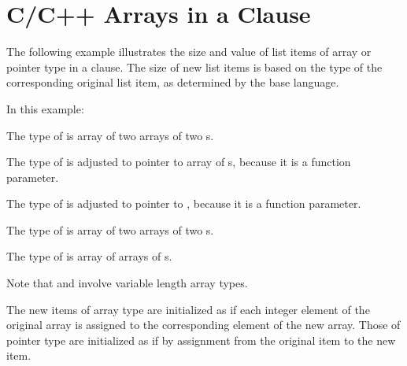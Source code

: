 \section{C/C++ Arrays in a  Clause}
\ccppspecificstart
\label{sec:carrays_fpriv}

The following example illustrates the size and value of list items of array or 
pointer type in a  clause. The size of new list items is 
based on the type of the corresponding original list item, as determined by the 
base language.

In this example:

\begin{compactitem}
\item The type of  is array of two arrays of two s.

\item  The type of  is adjusted to pointer to array of  
s, because it is a function parameter.

\item  The type of  is adjusted to pointer to , because 
it is a function parameter.

\item  The type of  is array of two arrays of two s.

\item  The type of  is array of  arrays of  
s.
\end{compactitem}

Note that   and  involve variable length array types.

The new items of array type are initialized as if each integer element of the original 
array is assigned to the corresponding element of the new array. Those of pointer 
type are initialized as if by assignment from the original item to the new item.

\ccppspecificend


